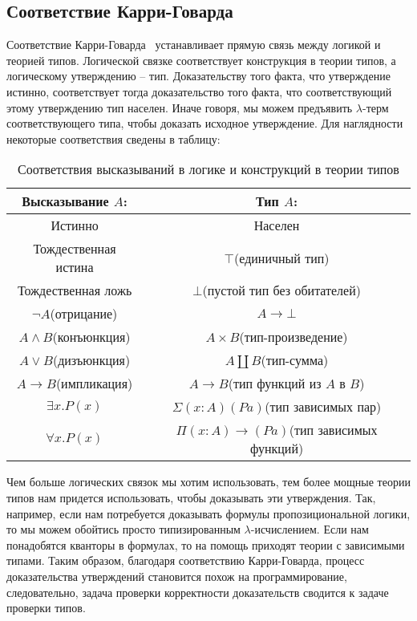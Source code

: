 \subsection{Соответствие Карри-Говарда}
Соответствие Карри-Говарда~\cite{howard1980formulae} устанавливает прямую связь между логикой и теорией типов. Логической связке соответствует конструкция в теории типов, а логическому утверждению -- тип. Доказательству того факта, что утверждение истинно, соответствует тогда доказательство того факта, что соответствующий этому утверждению тип населен. Иначе говоря, мы можем предъявить $\lambda$-терм соответствующего типа, чтобы доказать исходное утверждение. Для наглядности некоторые соответствия сведены в таблицу:

\begin{table}[H]
  \centering
  \begin{tabular}{| c | c |}
    \hline
    Высказывание $A$: & Тип $A$: \\
    \hline
    Истинно & Населен \\
    \hline
    Тождественная истина & $\top$(единичный тип) \\
    \hline
    Тождественная ложь & $\bot$(пустой тип без обитателей) \\
    \hline
    $\lnot A$(отрицание) & $A \to \bot$ \\
    \hline
    $A \land B$(конъюнкция) & $A \times B$(тип-произведение) \\
    \hline
    $A \lor B$(дизъюнкция) & $A \coprod B$(тип-сумма) \\
    \hline
    $A \to B$(импликация) & $A \to B$(тип функций из $A$ в $B$) \\
    \hline
    $\exists x.P(x)$ & $\Sigma (x : A) (P a)$(тип зависимых пар) \\
    \hline
    $\forall x.P(x)$ & $\Pi (x : A) \to (P a)$(тип зависимых функций) \\
    \hline
  \end{tabular}
  \caption{Соответствия высказываний в логике и конструкций в теории типов}
\end{table}

Чем больше логических связок мы хотим использовать, тем более мощные теории типов  нам придется использовать, чтобы доказывать эти утверждения. Так, например, если нам потребуется доказывать формулы пропозициональной логики, то мы можем обойтись просто типизированным $\lambda$-исчислением. Если нам понадобятся кванторы в формулах, то на помощь приходят теории с зависимыми типами. Таким образом, благодаря соответствию Карри-Говарда, процесс доказательства утверждений становится похож на программирование, следовательно, задача проверки корректности доказательств сводится к задаче проверки типов.

